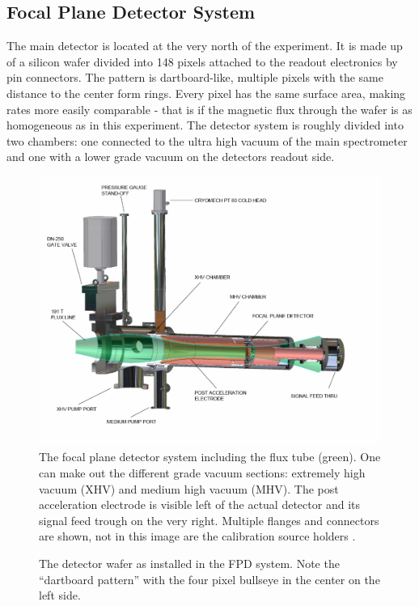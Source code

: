       \subsection{Focal Plane Detector System}
      \label{ch:The KATRIN experiment:sec:Experimental setup:subsec:FPD system}
      The main detector is located at the very north of the experiment. It is made up of a silicon wafer divided into 148 pixels attached to the readout electronics by pin connectors. The pattern is dartboard-like, multiple pixels with the same distance to the center form rings. Every pixel has the same surface area, making rates more easily comparable - that is if the magnetic flux through the wafer is as homogeneous as in this experiment.
      The detector system is roughly divided into two chambers: one connected to the ultra high vacuum of the main spectrometer and one with a lower grade vacuum on the detectors readout side.
      
      
      \begin{figure}
      \centering
	\includegraphics[width = 0.8 \textwidth]{graphics/katrinExperiment/detectorHousing.pdf}
	\caption[Focal plane detector system]{The focal plane detector system including the flux tube (green). One can make out the different grade vacuum sections: extremely high vacuum (XHV) and medium high vacuum (MHV). The post acceleration electrode is visible left of the actual detector and its signal feed trough on the very right. Multiple flanges and connectors are shown, not in this image are the calibration source holders \cite{FPD}.}
	\label{fig:katrinExperiment:detectorHousing}
      \end{figure}
      
      \begin{figure}
	  \caption[Detector wafer]{The detector wafer as installed in the FPD system. Note the ``dartboard pattern'' with the four pixel bullseye in the center on the left side.}
	  \label{fig:katrinExperiment:detectorWafer}
      \end{figure}
      
